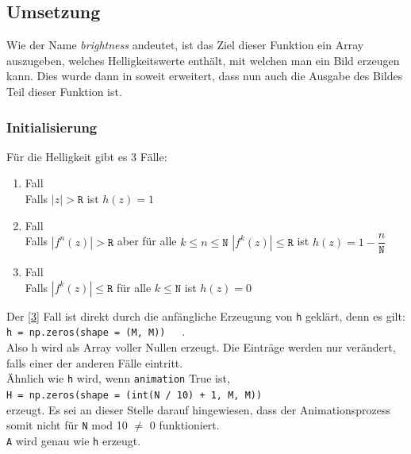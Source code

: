 \documentclass[12pt]{scrartcl}
\newcommand\tab[1][1cm]{\hspace*{#1}}
\begin{document}
\subsection{Umsetzung}
Wie der Name \textit{brightness} andeutet, ist das Ziel dieser Funktion ein Array auszugeben, welches Helligkeitswerte enthält, mit welchen man ein Bild erzeugen kann. Dies wurde dann in soweit erweitert, dass nun auch die Ausgabe des Bildes Teil dieser Funktion ist.\\\subsubsection{Initialisierung}\label{Initialisierung}


Für die Helligkeit gibt es 3 Fälle:
\begin{enumerate}[label=\arabic*.]
\item \label{1} Fall\\
Falls $|z| > \texttt{R}$ ist $h(z) = 1$
\item \label{2} Fall\\
Falls $|f^n(z)| > \texttt{R}$ aber für alle $k \leq n \leq \texttt{N}$ $|f^k(z)| \leq \texttt{R}$ ist $h(z) = 1 - \dfrac{n}{\texttt{N}}$
\item \label{3} Fall\\
Falls $|f^k(z)| \leq \texttt{R}$ für alle $k \leq \texttt{N}$ ist $h(z) = 0$
\end{enumerate}

Der \ref{3} Fall ist direkt durch die anfängliche Erzeugung von \texttt{h} geklärt, denn es gilt:\\

\tab \texttt{h = np.zeros(shape = (M, M))}~~~.\\

Also h wird als Array voller Nullen erzeugt. Die Einträge werden nur verändert, falls einer der anderen Fälle eintritt.\\

Ähnlich wie \texttt{h} wird, wenn \texttt{animation} True ist,\\

\tab \texttt{H = np.zeros(shape = (int(N / 10) + 1, M, M))}\\

erzeugt. Es sei an dieser Stelle darauf hingewiesen, dass der Animationsprozess somit nicht für \texttt{N} mod 10 $\neq$ 0 funktioniert.\\

\texttt{A} wird genau wie \texttt{h} erzeugt.\\
\end{document}
